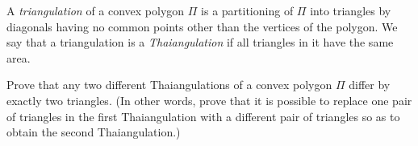 A \emph{triangulation} of a convex polygon $\Pi$ is a partitioning of $\Pi$ into triangles by diagonals having no common points other than the vertices of the polygon. We say that a triangulation is a \emph{Thaiangulation} if all triangles in it have the same area.

Prove that any two different Thaiangulations of a convex polygon $\Pi$ differ by exactly two triangles. (In other words, prove that it is possible to replace one pair of triangles in the first Thaiangulation with a different pair of triangles so as to obtain the second Thaiangulation.)
